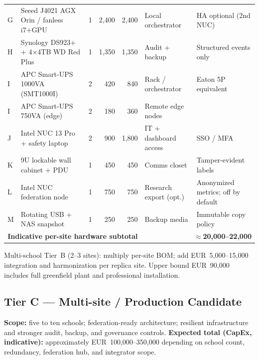 \begin{longtable}{@{}p{0.7cm}p{2.4cm}p{2.6cm}r r p{2.2cm}p{2.5cm}@{}}
  G & Seeed J4021 AGX Orin / fanless i7+GPU & 1 & 2{,}400 & 2{,}400 &
    Local orchestrator & HA optional (2nd NUC) \\
  H & Synology DS923+ + 4×4TB WD Red Plus & 1 & 1{,}350 & 1{,}350 &
    Audit + backup & Structured events only \\
  I & APC Smart-UPS 1000VA (SMT1000I) & 2 & 420 & 840 &
    Rack / orchestrator & Eaton 5P equivalent \\
  I & APC Smart-UPS 750VA (edge) & 2 & 180 & 360 &
    Remote edge nodes & \\
  J & Intel NUC 13 Pro + safety laptop & 2 & 900 & 1{,}800 &
    IT + dashboard access & SSO / MFA \\
  K & 9U lockable wall cabinet + PDU & 1 & 450 & 450 &
    Comms closet & Tamper-evident labels \\
  L & Intel NUC federation node & 1 & 750 & 750 &
    Research export (opt.) & Anonymized metrics; off by default \\
  M & Rotating USB + NAS snapshot & 1 & 250 & 250 &
    Backup media & Immutable copy policy \\
  \midrule
  \multicolumn{5}{r}{\textbf{Indicative per-site hardware subtotal}} &
    \multicolumn{2}{r}{\textbf{$\approx$20{,}000--22{,}000}} \\
\end{longtable}

\noindent Multi-school Tier~B (2--3 sites): multiply per-site BOM; add EUR~5{,}000--15{,}000 integration
and harmonization per replica site.
Upper bound EUR~90{,}000 includes full greenfield plant and professional installation.

\subsection{Tier C --- Multi-site / Production Candidate}

\textbf{Scope:} five to ten schools; federation-ready architecture; resilient infrastructure and
stronger audit, backup, and governance controls.
\textbf{Expected total (CapEx, indicative):} approximately EUR~100{,}000--350{,}000 depending on
school count, redundancy, federation hub, and integrator scope.

